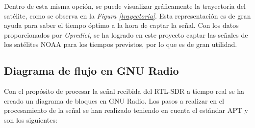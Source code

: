 \documentclass[a4paper,openright,12pt]{article}
\begin{document}
 
  Dentro de esta misma opción, se puede visualizar gráficamente la trayectoria del satélite, como se observa en la \textit{Figura \ref{trayectoria}}. Esta representación es de gran ayuda para saber el tiempo óptimo a la hora de captar la señal. Con los datos proporcionados por \textit{Gpredict}, se ha logrado en este proyecto captar las señales de los satélites NOAA para los tiempos previstos, por lo que es de gran utilidad.

	\subsection{Diagrama de flujo en GNU Radio}
	Con el propósito de procesar la señal recibida del RTL-SDR a tiempo real se ha creado un diagrama de bloques en GNU Radio. Los pasos a realizar en el procesamiento de la señal se han realizado teniendo en cuenta el estándar APT y son los siguientes:
\end{document}
